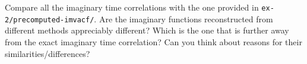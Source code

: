 \documentclass{article}
\begin{document}
\begin{Exercise}[label={relationship},title={Relationship between imaginary and real time correlations}]
Compare all the imaginary time correlations with the one provided in \texttt{ex-2/precomputed-imvacf/}. Are the imaginary functions reconstructed from different methods appreciably different? Which is the one that is further away from the exact imaginary time correlation? Can you think about reasons for their similarities/differences?


\end{Exercise}


\clearpage





\end{document}
